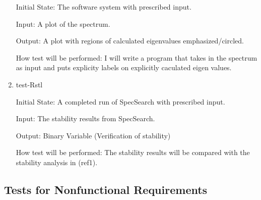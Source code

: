 \documentclass[12pt, titlepage]{article}
\begin{document}
\begin{enumerate}
Initial State: The software system with prescribed input. 

Input: A plot of the spectrum. 

Output: A plot with regions of calculated eigenvalues emphasized/circled. 

How test will be performed: I will write a program that takes in the spectrum 
as input and puts explicity labels on explicitly caculated eigen values. 

\item{test-Rstl} 

Initial State: A completed run of SpecSearch with prescribed input. 

Input: The stability results from SpecSearch. 

Output: Binary Variable (Verification of stability) 

How test will be performed: The stability results will be compared with the 
stability analysis in (ref1). 

\end{enumerate}

\subsection{Tests for Nonfunctional Requirements}
\end{document}
